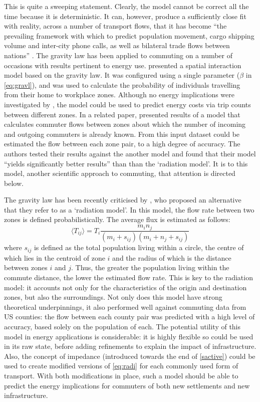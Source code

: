 This is quite a sweeping statement. Clearly, the model cannot be correct all
the time because it is deterministic. It can, however, produce a
sufficiently close fit with reality, across a number of transport flows, that it
has become ``the prevailing framework with which to predict population movement,
cargo shipping volume and inter-city phone calls, as well as bilateral trade
flows between nations'' \citep{Simini2012}. The gravity law has been applied to
commuting on a number of occasions with results pertinent to energy use.
\citet{gargiulo2012} presented a spatial interaction model based on the
gravity law. It was configured using a single parameter ($\beta$ in \cref{eq:gravl}),
and was used to calculate the probability of individuals travelling
from their home to workplace zones. Although no energy implications were investigated
by \citet{gargiulo2012}, the model could be used to
predict energy costs via trip counts between different zones.
In a related paper, \citet{Lenormandplosone2012} presented results of
a model that calculates commuter flows between zones about which the number
of incoming and outgoing commuters is already known. From this input dataset
could be estimated the flow between each zone pair, to a high degree of accuracy.
The authors tested their results against the another model and
found that their model ``yields significantly better results''
\citep[p.~6]{Lenormandplosone2012} than than the `radiation model'. It is to
this model, another scientific approach to commuting, that attention is directed
below.

The gravity law has been recently criticised by
\citet{Simini2012}, who proposed an alternative that they refer to as a
`radiation model'. In this model, the flow rate between two zones is defined
probabilistically. The average flux is estimated as follows:
\begin{equation}
\langle T_{ij} \rangle = T_i \frac{m_{i} n_{j}} {(m_i + s_{ij})(m_i + n_j + s_{ij}) }
\label{eq:radi}
\end{equation}
where $s_{ij}$ is defined as the total population living within a circle, the
centre of which lies in the centroid of zone $i$ and the radius of which is
the distance between zones $i$ and $j$. Thus, the greater the population
living within the commute distance, the lower the estimated flow rate.
This is key to the radiation model: it accounts not only for the characteristics
of the origin and destination zones, but also the surroundings.
Not only does this model have strong theoretical underpinnings, it also
performed well against commuting data from US counties: the flow between
each county pair was predicted with a high level of accuracy, based solely
on the population of each. The potential utility of this model in
energy applications is considerable: it is highly flexible so could be used in its
raw state, before adding refinements to explain the impact of infrastructure.
Also, the concept of impedance (introduced towards the end of \cref{sactive})
could be used to create modified versions of \cref{eq:radi}
for each commonly used form of transport. With both modifications in place,
such a model should be able to predict the energy implications for commuters of both
new settlements and new infrastructure.

